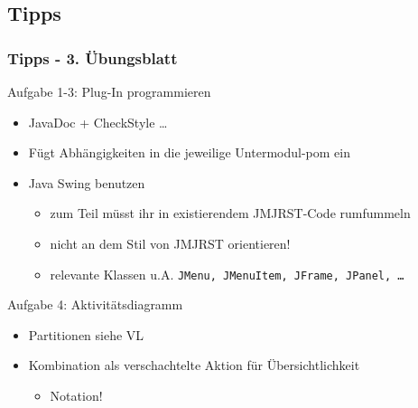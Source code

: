 \documentclass[18pt]{beamer}
\begin{document}
	\subsection{Tipps}
	\begin{frame}
		\frametitle{Tipps - 3. Übungsblatt}
			\begin{exampleblock}{Aufgabe 1-3: Plug-In programmieren}
				\begin{itemize}
					\pause
					\item JavaDoc + CheckStyle \dots \pause
					\item Fügt Abhängigkeiten in die jeweilige Untermodul-pom ein \pause
					\item Java Swing benutzen
					\begin{itemize}
						\item zum Teil müsst ihr in existierendem JMJRST-Code rumfummeln
						\item nicht an dem Stil von JMJRST orientieren!
						\item relevante Klassen u.A. \texttt{JMenu, JMenuItem, JFrame, JPanel, \dots}
					\end{itemize}
				\end{itemize}
			\end{exampleblock}
			\pause
			\begin{exampleblock}{Aufgabe 4: Aktivitätsdiagramm}
				\begin{itemize}
					\item Partitionen siehe VL
					\item Kombination als verschachtelte Aktion für Übersichtlichkeit
					\begin{itemize}
						\item Notation!
					\end{itemize}
				\end{itemize}
			\end{exampleblock}
	\end{frame}
\end{document}
